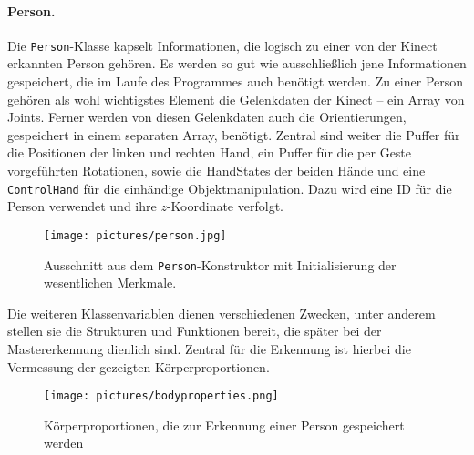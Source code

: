 	\paragraph{Person.} Die \texttt{Person}-Klasse kapselt Informationen, die logisch zu einer von der Kinect erkannten Person gehören. Es werden so gut wie ausschließlich jene Informationen gespeichert, die im Laufe des Programmes auch benötigt werden. Zu einer Person gehören als wohl wichtigstes Element die Gelenkdaten der Kinect -- ein Array von Joints. Ferner werden von diesen Gelenkdaten auch die Orientierungen, gespeichert in einem separaten Array, benötigt. Zentral sind weiter die Puffer für die Positionen der linken und rechten Hand, ein Puffer für die per Geste vorgeführten Rotationen, sowie die HandStates der beiden Hände und eine \glqq \texttt{ControlHand}\grqq{} für die einhändige Objektmanipulation. Dazu wird eine ID für die Person verwendet und ihre $z$-Koordinate verfolgt. 
	\begin{figure}[h]
	\centering
	\texttt{[image: pictures/person.jpg]}
	\caption{Ausschnitt aus dem \texttt{Person}-Konstruktor mit Initialisierung der wesentlichen Merkmale.}
	\end{figure}\par\medskip
	
	Die weiteren Klassenvariablen dienen verschiedenen Zwecken, unter anderem stellen sie die Strukturen und Funktionen bereit, die später bei der Mastererkennung dienlich sind. Zentral für die Erkennung ist hierbei die Vermessung der gezeigten Körperproportionen.
	\begin{figure}[h]
	\centering
	\texttt{[image: pictures/bodyproperties.png]}
	\caption{Körperproportionen, die zur Erkennung einer Person gespeichert werden}
	\end{figure}\par\medskip
	

